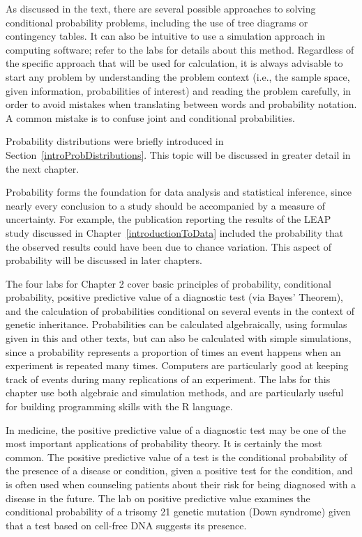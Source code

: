 As discussed in the text, there are several possible approaches to solving conditional probability problems, including the use of tree diagrams or contingency tables. It can also be intuitive to use a simulation approach in computing software; refer to the labs for details about this method. Regardless of the specific approach that will be used for calculation, it is always advisable to start any problem by understanding the problem context (i.e., the sample space, given information, probabilities of interest) and reading the problem carefully, in order to avoid mistakes when translating between words and probability notation. A common mistake is to confuse joint and conditional probabilities.

Probability distributions were briefly introduced in Section~\ref{introProbDistributions}. This topic will be discussed in greater detail in the next chapter.

Probability forms the foundation for data analysis and statistical inference, since nearly every conclusion to a study should be accompanied by a measure of uncertainty. For example, the publication reporting the results of the LEAP study discussed in Chapter~\ref{introductionToData} included the probability that the observed results could have been due to chance variation. This aspect of probability will be discussed in later chapters.

The four labs for Chapter 2 cover basic principles of probability, conditional probability, positive predictive value of a diagnostic test (via Bayes' Theorem), and the calculation of probabilities conditional on several events in the context of genetic inheritance. Probabilities can be calculated algebraically, using formulas given in this and other texts, but can also be calculated with simple simulations, since a probability represents a proportion of times an event happens when an experiment is repeated many times.  Computers are particularly good at keeping track of events during many replications of an experiment.  The labs for this chapter use both algebraic and simulation methods, and are particularly useful for building programming skills with the \textsf{R} language.

In medicine, the positive predictive value of a diagnostic test may be one of the most important applications of probability theory. It is certainly the most common. The positive predictive value of a test is the conditional probability of the presence of a disease or condition, given a positive test for the condition, and is often used when counseling patients about their risk for being diagnosed with a disease in the future.  The lab on positive predictive value examines the conditional probability of a trisomy 21 genetic mutation (Down syndrome) given that a test based on cell-free DNA suggests its presence.

